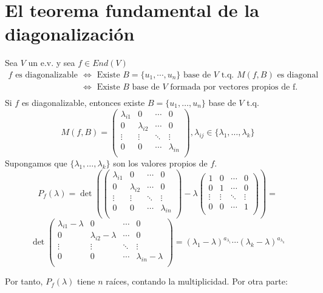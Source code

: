\documentclass[x11names,table]{report}
\begin{document}
\section{El teorema fundamental de la diagonalización}
Sea $V$ un e.v. y sea $f\in End(V)$
\[
\begin{split}
f \text{ es diagonalizable } &\Leftrightarrow \text{ Existe } B=\{u_1,\cdots,u_n\} \text{ base de } V \text{ t.q. } M(f,B) \text{ es diagonal }\\
&\Leftrightarrow \text{ Existe } B \text{ base de } V \text{ formada por vectores propios de f.}\\
\end{split}
\]
Si $f$ es diagonalizable, entonces existe $B=\{u_1,\dots,u_n\}$ base de $V$ t.q.
\[
M(f,B)=\begin{pmatrix}
\lambda_{i1}&0&\cdots&0\\
0&\lambda_{i2}&\cdots&0\\
\vdots&\vdots&\ddots&\vdots\\
0&0&\cdots&\lambda_{in}\\
\end{pmatrix}, \lambda_{ij}\in\{\lambda_1,\dots,\lambda_k\}
\]
Supongamos que $\{\lambda_1,\dots,\lambda_k\}$ son los valores propios de $f$.
\[
P_f(\lambda)=\det\left(
\begin{pmatrix}
\lambda_{i1}&0&\cdots&0\\
0&\lambda_{i2}&\cdots&0\\
\vdots&\vdots&\ddots&\vdots\\
0&0&\cdots&\lambda_{in}\\
\end{pmatrix}-\lambda\begin{pmatrix}
1&0&\cdots&0\\
0&1&\cdots&0\\
\vdots&\vdots&\ddots&\vdots\\
0&0&\cdots&1\\
\end{pmatrix}\right)=
\]\[
\det\begin{pmatrix}
\lambda_{i1}-\lambda&0&\cdots&0\\
0&\lambda_{i2}-\lambda&\cdots&0\\
\vdots&\vdots&\ddots&\vdots\\
0&0&\cdots&\lambda_{in}-\lambda\\
\end{pmatrix}=(\lambda_1-\lambda)^{a_{\lambda_1}}\cdots(\lambda_k-\lambda)^{a_{\lambda_k}}
\]

Por tanto, $P_f(\lambda)$ tiene $n$ raíces, contando la multiplicidad. Por otra parte:
\end{document}
